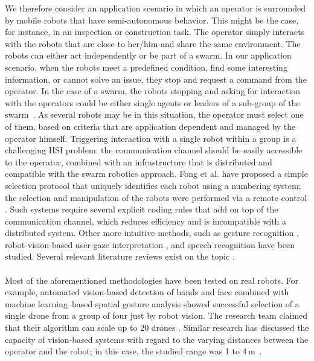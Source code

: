 \documentclass[smallextended]{svjour3}
\begin{document}
We therefore consider an application scenario in which an operator is surrounded by mobile robots that have semi-autonomous behavior. This might be the case, for instance, in an inspection or construction task. 
The operator simply interacts with the robots that are close to her/him and share the same environment. 
The robots can either act independently or be part of a swarm. 
In our application scenario, when the robots meet a predefined condition, find some interesting information, or cannot solve an issue, they stop and request a command from the operator. In the case of a swarm, the robots stopping and asking for interaction with the operators could be either single agents or leaders of a sub-group of the swarm~\cite{Goodrich2012}. 
As several robots may be in this situation, the operator must select one of them, based on criteria that are application dependent and managed by the operator himself. Triggering interaction with a single robot within a group is a challenging HSI problem: the communication channel should be easily accessible to the operator, combined with an infrastructure that is distributed and compatible with the swarm robotics approach.
Fong et al. have proposed a simple selection protocol that uniquely identifies each robot using a numbering system; the selection and manipulation of the robots were performed via a remote control \cite{fong2003}. 
Such systems require several explicit coding rules that add on top of the communication channel, which reduces efficiency and is incompatible with a distributed system. 
Other more intuitive methods, such as gesture recognition \cite{Couture-Beil2010,Jones2010,Monajjemi2013,Nagietal2014}, robot-vision-based user-gaze interpretation \cite{Couture-Beil2010,Monajjemi2013,Pourmehr2013}, and speech recognition \cite{Pourmehr2013} have been studied. 
Several relevant literature reviews exist on the topic \cite{goodrich2007human,Kolling2016,yanco2004classifying}.\\
\\
Most of the aforementioned methodologies have been tested on real robots. 
For example, automated vision-based detection of hands and face combined with machine learning--based spatial gesture analysis showed successful selection of a single drone from a group of four just by robot vision. 
The research team claimed that their algorithm can scale up to 20 drones \cite{Nagietal2014}. Similar research has discussed the capacity of vision-based systems with regard to the varying distances between the operator and the robot; in this case, the studied range was 1 to 4\,m~\cite{Couture-Beil2010}. 
\end{document}
